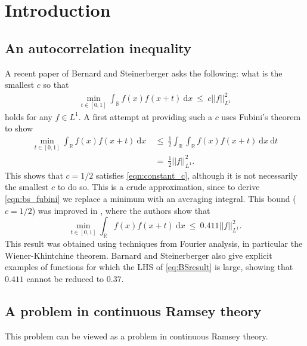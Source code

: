 \documentclass[11pt,reqno]{amsart}
\numberwithin{equation}{section}
\theoremstyle{plain}
\newcommand{\R}{\ensuremath{\mathbb{R}}}
\begin{document}
\tableofcontents


\section{Introduction}\label{section:introduction}

\subsection{An autocorrelation inequality}
A recent paper of Bernard and Steinerberger \cite{BS} asks the following: what is the smallest $c$ so that
\begin{align}\label{eqn:constant_c}
\min_{t \in [0,1]} \int_\R f(x) f(x+t)\ \mathrm{d}x \ \leq\ c ||f||_{L^1}^2
\end{align}
holds for any $f \in L^1$.
A first attempt at providing such a $c$ uses Fubini's theorem to show
\begin{align}\label{eqn:bs_fubini}
    \min\limits_{t\in[0,1]}\int_{\R}f(x)f(x+t)\ \mathrm{d}x  &\ \le\  \frac{1}{2}\int_{\R}\int_{\R}f(x)f(x+t)\ \mathrm{d}x\ \mathrm{d}t\nonumber\\
    &\ =\  \frac{1}{2}||f||_{L^1}^{2}.
\end{align}
This shows that $c = 1/2$ satisfies \eqref{eqn:constant_c}, although it is not necessarily the smallest $c$ to do so. This is a crude approximation, since to derive \eqref{eqn:bs_fubini} we replace a minimum with an averaging integral. This bound ($c=1/2$) was improved in \cite{BS}, where the authors show that
\begin{equation}\label{eq:BSresult}
    \min\limits_{t\in[0,1]}\int_{\R}f(x)f(x+t)\ \mathrm{d}x \ \le\   0.411 ||f||_{L^1}^{2}.
\end{equation}
This result was obtained using techniques from Fourier analysis, in particular the Wiener-Khintchine theorem. Barnard and Steinerberger also give explicit examples of functions for which the LHS of \eqref{eq:BSresult} is large, showing that $0.411$ cannot be reduced to $0.37$.

\subsection{A problem in continuous Ramsey theory}
This problem can be viewed as a problem in continuous Ramsey theory.
\end{document}
